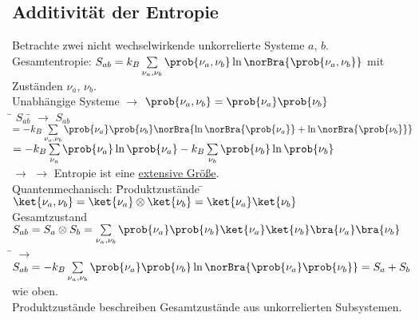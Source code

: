 \subsection{Additivität der Entropie}
\begin{tabbing}
Betrachte zwei nicht wechselwirkende unkorrelierte Systeme $a$, $b$.\\
Gesamtentropie: $S_{ab}=k_B\sum\limits_{\nu_a,\nu_b}\prob{\nu_a,\nu_b}\ln\norBra{\prob{\nu_a,\nu_b}}$ mit Zuständen $\nu_a$, $\nu_b$.\\
Unabhängige Systeme $\rightarrow$ $\prob{\nu_a,\nu_b} = \prob{\nu_a}\prob{\nu_b}$\\
\hspace{4em} \= $S_{ab}$\= \kill
$\rightarrow$\> $S_{ab}$\>$ = - k_B \sum\limits_{\nu_a,\nu_b} \prob{\nu_a}\prob{\nu_b}\norBra{\ln\norBra{\prob{\nu_a}}+\ln\norBra{\prob{\nu_b}}}$\\
\>\> $=-k_B \sum\limits_{\nu_a} \prob{\nu_a}\ln\prob{\nu_a} - k_B \sum\limits_{\nu_b}\prob{\nu_b}\ln\prob{\nu_b}$\\
$\rightarrow$\> $\rightarrow$ Entropie ist eine \uline{extensive Größe}.\\
Quantenmechanisch: \= Produktzustände \= $\ket{\nu_a,\nu_b} = \ket{\nu_a} \otimes \ket{\nu_b} = \ket{\nu_a}\ket{\nu_b}$\\
\>Gesamtzustand \> $S_{ab} = S_a \otimes S_b = \sum\limits_{\nu_a,\nu_b}\prob{\nu_a}\prob{\nu_b} \ket{\nu_a}\ket{\nu_b}\bra{\nu_a}\bra{\nu_b}$\\
\hspace{4em} \= \kill
$\rightarrow$\> $S_{ab} = - k_B \sum\limits_{\nu_a,\nu_b} \prob{\nu_a}\prob{\nu_b} \ln\norBra{\prob{\nu_a}\prob{\nu_b}} = S_a + S_b$ wie oben.\\
Produktzustände beschreiben Gesamtzustände aus unkorrelierten Subsystemen.
\end{tabbing}
